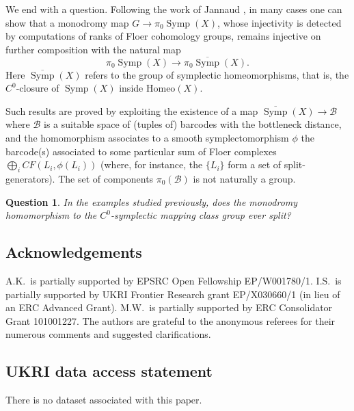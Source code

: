 \documentclass[pdftex]{sigma}
\DeclareMathOperator{\Symp}{Symp}
\newtheorem{qn}[thm]{Question}
\theoremstyle{definition}
\numberwithin{equation}{section}
\begin{document}
We end with a question. Following the work of Jannaud \cite{Jannaud}, in many cases one can show that a monodromy map $G \to \pi_0\Symp(X)$, whose injectivity is detected by computations of ranks of Floer cohomology groups, remains injective on further composition with the natural map
\[
\pi_0\Symp(X) \to \pi_0\overline{\Symp}(X).
\]
Here $\overline{\Symp}(X)$ refers to the group of symplectic homeomorphisms, that is, the $C^0$-closure of $\Symp(X)$ inside $\mathrm{Homeo}(X)$.

Such results are proved by exploiting the existence of a map $\overline{\Symp}(X) \to \mathcal{B}$ where $\mathcal{B}$ is a suitable space of (tuples of) barcodes with the bottleneck distance, and the homomorphism associates to a smooth symplectomorphism $\phi$ the barcode(s) associated to some particular sum of Floer complexes $\bigoplus_i {CF}(L_i,\phi(L_i))$ (where, for instance, the $\{L_i\}$ form a set of split-generators). The set of components $\pi_0(\mathcal{B})$ is not naturally a group.

\begin{qn}
 In the examples studied previously, does the monodromy homomorphism to the $C^0$-symplectic mapping class group ever split?
\end{qn}


\subsection*{Acknowledgements}
 A.K.~is partially supported by EPSRC Open Fellowship EP/W001780/1.
 I.S.~is partially supported by UKRI Frontier Research grant EP/X030660/1 (in lieu of an ERC Advanced Grant). M.W.~is partially supported by ERC Consolidator Grant 101001227. The authors are grateful to the anonymous referees for their numerous comments and suggested clarifications.

\subsection*{UKRI data access statement}
There is no dataset associated with this paper.

\end{document}
